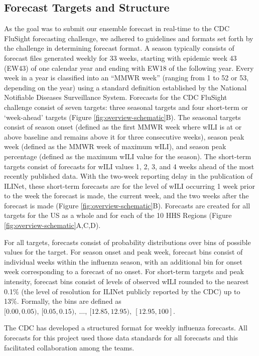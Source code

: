 \documentclass{article}\usepackage[]{graphicx}\usepackage[]{color}
\begin{document}
\subsection*{Forecast Targets and Structure}
As the goal was to submit our ensemble forecast in real-time to the CDC FluSight forecasting challenge, we adhered to guidelines and formats set forth by the challenge in determining forecast format.
A season typically consists of forecast files generated weekly for 33 weeks, starting with epidemic week 43 (EW43) of one calendar year and ending with EW18 of the following year.
Every week in a year is classified into an ``MMWR week'' (ranging from 1 to 52 or 53, depending on the year) using a standard definition established by the National Notifiable Diseases Surveillance System.\cite{NewMexicoDepartmentofHealth,Niemi2015,Tushar2018}
Forecasts for the CDC FluSight challenge consist of seven targets: three seasonal targets and four short-term or `week-ahead' targets (Figure \ref{fig:overview-schematic}B). 
The seasonal targets consist of season onset (defined as the first MMWR week where wILI is at or above baseline and remains above it for three consecutive weeks), season peak week (defined as the MMWR week of maximum wILI), and season peak percentage (defined as the maximum wILI value for the season). The short-term targets consist of forecasts for wILI values 1, 2, 3, and 4 weeks ahead of the most recently published data. With the two-week reporting delay in the publication of ILINet, these short-term forecasts are for the level of wILI occurring 1 week prior to the week the forecast is made, the current week, and the two weeks after the forecast is made (Figure \ref{fig:overview-schematic}B). Forecasts are created for all targets for the US as a whole and for each of the 10 HHS Regions (Figure \ref{fig:overview-schematic}A,C,D).

For all targets, forecasts consist of probability distributions over bins of possible values for the target. For season onset and peak week, forecast bins consist of individual weeks within the influenza season, with an additional bin for onset week corresponding to a forecast of no onset. For short-term targets and peak intensity, forecast bins consist of levels of observed wILI rounded to the nearest 0.1\% (the level of resolution for ILINet publicly reported by the CDC) up to 13\%. Formally, the bins are defined as $[0.00, 0.05),\ [0.05, 0.15),\ \dots,\ [12.85, 12.95),\ [12.95, 100]$. 

The CDC has developed a structured format for weekly influenza forecasts. All forecasts for this project used those data standards for all forecasts and this facilitated collaboration among the teams.
\end{document}
